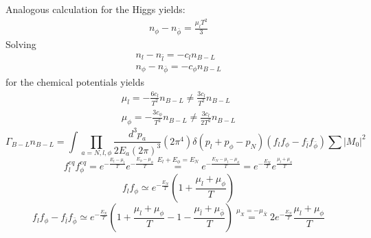 Analogous calculation for the Higgs yields:
\begin{align*}
	n_\phi-n_{\bar{\phi}}=\frac{\mu_lT^2}{3}
\end{align*}
Solving
\begin{align*}
	n_l-n_{\bar{l}}=-c_ln_{B-L}\\
	n_\phi-n_{\bar{\phi}}=-c_\phi n_{B-L}
\end{align*}
for the chemical potentials yields
\begin{align*}
	\mu_l=-\frac{6c_l}{T^2}n_{B-L}\neq\frac{3c_l}{T^2}n_{B-L}\\
	\mu_\phi=-\frac{3c_\phi}{T^2}n_{B-L}\neq\frac{3c_l}{2T^2}n_{B-L}
\end{align*}
\newpage
\begin{equation*}
	\Gamma_{B-L}n_{B-L}=\int\prod_{a=N,l,\phi}\frac{d^3p_a}{2E_a(2\pi)^3}(2\pi^4)\delta(p_l+p_\phi-p_N)(	f_lf_\phi-f_{\bar{l}}f_{\bar{\phi}})\sum|M_0|^2
\end{equation*}
\newline
\begin{equation*}
	f_l^{eq}f_\phi^{eq}=e^{-\frac{E_l-\mu_l}{T}}e^{-\frac{E_\phi-\mu_\phi}{T}}\overset{E_l+E_\phi=E_N}{=}e^{-\frac{E_N-\mu_l-\mu_\phi}{T}}=e^{-\frac{E_N}{T}}e^{\frac{\mu_l+\mu_\phi}{T}}
\end{equation*}
\begin{equation*}
	f_lf_\phi\simeq e^{-\frac{E_N}{T}}\left(1+\frac{\mu_l+\mu_\phi}{T}\right)
\end{equation*}
\begin{equation*}
	f_lf_\phi-f_{\bar{l}}f_{\bar{\phi}}\simeq e^{-\frac{E_N}{T}}\left(1+\frac{\mu_l+\mu_\phi}{T}-1-\frac{\mu_{\bar{l}}+\mu_{\bar{\phi}}}{T}\right)\overset{\mu_X=-\mu_{\bar{X}}}{=}2e^{-\frac{E_N}{T}}\frac{\mu_l+\mu_\phi}{T}
\end{equation*}

\newpage